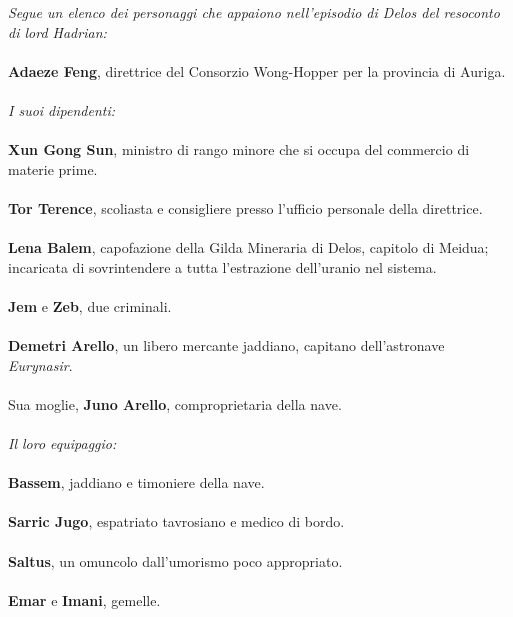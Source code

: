 \textit{Segue un elenco dei personaggi che appaiono nell'episodio di Delos del
resoconto di lord Hadrian:}
\leavevmode\\
\leavevmode\\
\phantom{123}\textbf{Adaeze Feng}, direttrice del Consorzio Wong-Hopper per la
provincia di Auriga.
\leavevmode\\
\leavevmode\\
\textit{I suoi dipendenti:}
\leavevmode\\
\leavevmode\\
\phantom{123}\textbf{Xun Gong Sun}, ministro di rango minore che si occupa del
commercio di materie prime.
\leavevmode\\
\leavevmode\\
\phantom{123}\textbf{Tor Terence}, scoliasta e consigliere presso l'ufficio personale
della direttrice.
\leavevmode\\
\leavevmode\\
\phantom{123}\textbf{Lena Balem}, capofazione della Gilda Mineraria di Delos,
capitolo di Meidua; incaricata di sovrintendere a tutta l'estrazione
dell'uranio nel sistema.
\leavevmode\\
\leavevmode\\
\phantom{123}\textbf{Jem} e \textbf{Zeb}, due criminali.
\leavevmode\\
\leavevmode\\
\phantom{123}\textbf{Demetri Arello}, un libero mercante jaddiano, capitano
dell'astronave \emph{Eurynasir}.
\leavevmode\\
\leavevmode\\
\phantom{123}Sua moglie, \textbf{Juno Arello}, comproprietaria della nave.
\leavevmode\\
\leavevmode\\
\textit{Il loro equipaggio:}
\leavevmode\\
\leavevmode\\
\phantom{123}\textbf{Bassem}, jaddiano e timoniere della nave.
\leavevmode\\
\leavevmode\\
\phantom{123}\textbf{Sarric Jugo}, espatriato tavrosiano e medico di bordo.
\leavevmode\\
\leavevmode\\
\phantom{123}\textbf{Saltus}, un omuncolo dall'umorismo poco appropriato.
\leavevmode\\
\leavevmode\\
\phantom{123}\textbf{Emar} e \textbf{Imani}, gemelle.
\leavevmode\\
\leavevmode\\
\leavevmode\\
